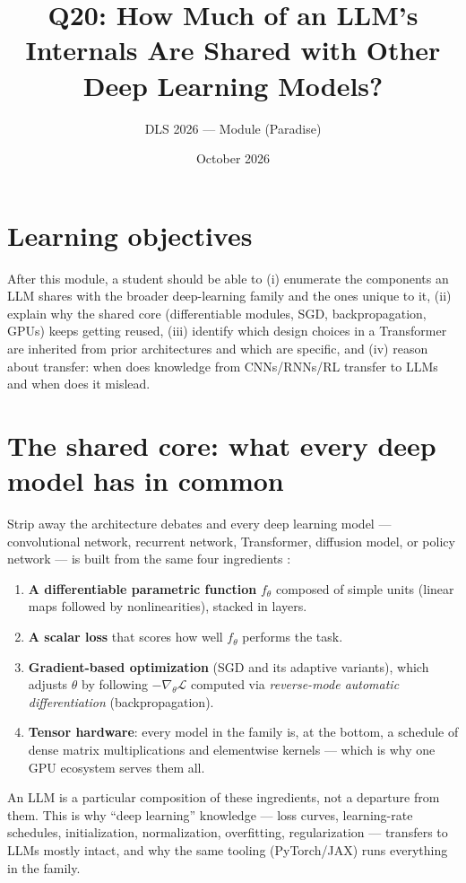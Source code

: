 \documentclass[11pt]{article}
\title{Q20: How Much of an LLM's Internals Are Shared with Other Deep Learning Models?}
\author{DLS 2026 --- Module (Paradise)}
\date{October 2026}
\begin{document}
\maketitle

\section*{Learning objectives}
After this module, a student should be able to (i) enumerate the components an LLM shares with the broader deep-learning family and the ones unique to it, (ii) explain why the shared core (differentiable modules, SGD, backpropagation, GPUs) keeps getting reused, (iii) identify which design choices in a Transformer are inherited from prior architectures and which are specific, and (iv) reason about transfer: when does knowledge from CNNs/RNNs/RL transfer to LLMs and when does it mislead.

\section{The shared core: what every deep model has in common}
Strip away the architecture debates and every deep learning model --- convolutional network, recurrent network, Transformer, diffusion model, or policy network --- is built from the same four ingredients \cite{goodfellow2016deep}:

\begin{enumerate}[noitemsep]
  \item \textbf{A differentiable parametric function} $f_\theta$ composed of simple units (linear maps followed by nonlinearities), stacked in layers.
  \item \textbf{A scalar loss} that scores how well $f_\theta$ performs the task.
  \item \textbf{Gradient-based optimization} (SGD and its adaptive variants), which adjusts $\theta$ by following $-\nabla_\theta \mathcal{L}$ computed via \emph{reverse-mode automatic differentiation} (backpropagation).
  \item \textbf{Tensor hardware}: every model in the family is, at the bottom, a schedule of dense matrix multiplications and elementwise kernels --- which is why one GPU ecosystem serves them all.
\end{enumerate}

An LLM is a particular composition of these ingredients, not a departure from them. This is why ``deep learning'' knowledge --- loss curves, learning-rate schedules, initialization, normalization, overfitting, regularization --- transfers to LLMs mostly intact, and why the same tooling (PyTorch/JAX) runs everything in the family.
\end{document}
